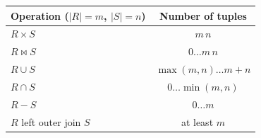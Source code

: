 \begin{center}
\renewcommand{\arraystretch}{1.3}
\begin{tabular}{l c}
\toprule
\textbf{Operation} ($|R| = m$, $|S| = n$) & \textbf{Number of tuples} \\
\midrule
$R \times S$ & $m\,n$ \\
$R \bowtie S$ & $0 \dots m\,n$ \\
$R \cup S$ & $\max(m, n) \dots m + n$ \\
$R \cap S$ & $0 \dots \min(m, n)$ \\
$R - S$ & $0 \dots m$ \\
$R$ left outer join $S$ & at least $m$ \\
\bottomrule
\end{tabular}
\end{center}
